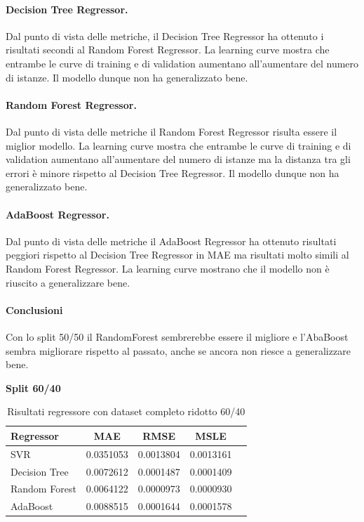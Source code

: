 \paragraph{\textbf{Decision Tree Regressor}.}
Dal punto di vista delle metriche, il Decision Tree Regressor ha ottenuto i risultati secondi al Random Forest Regressor. 
La learning curve mostra che entrambe le curve di training e di validation aumentano all'aumentare del numero di istanze. Il modello dunque non ha generalizzato bene.
\paragraph{\textbf{Random Forest Regressor}.}
Dal punto di vista delle metriche il Random Forest Regressor risulta essere il miglior modello.
La learning curve mostra che entrambe le curve di training e di validation aumentano all'aumentare del numero di istanze ma la distanza tra gli errori è minore rispetto al Decision Tree Regressor. Il modello dunque non ha generalizzato bene.
\paragraph{\textbf{AdaBoost Regressor}.}
Dal punto di vista delle metriche il AdaBoost Regressor ha ottenuto risultati peggiori rispetto al Decision Tree Regressor in MAE ma risultati molto simili al Random Forest Regressor.
La learning curve mostrano che il modello non è riuscito a generalizzare bene.

\paragraph{\textbf{Conclusioni}} Con lo split 50/50 il RandomForest sembrerebbe essere il migliore e l'AbaBoost sembra migliorare rispetto al passato, anche se ancora non riesce a generalizzare bene.

\newpage
\noindent\textbf{Split 60/40}


\begin{table}[H]
    \centering
    \begin{tabular}{|>{\centering\arraybackslash}m{5cm}|c|c|c|c|}
        \hline
        \textbf{Regressor} & \textbf{MAE} & \textbf{RMSE} & \textbf{MSLE} \\ [10pt]
        \hline
        SVR & 0.0351053 & 0.0013804 & 0.0013161 \\ [10pt]
        \hline
        Decision Tree & 0.0072612 & 0.0001487 & 0.0001409 \\ [10pt]
        \hline
        Random Forest & 0.0064122 & 0.0000973 & 0.0000930 \\ [10pt]
        \hline
        AdaBoost & 0.0088515 & 0.0001644 & 0.0001578 \\ [10pt]
        \hline
    \end{tabular}
    \caption{Risultati regressore con dataset completo ridotto 60/40}
    \label{tab:results}
\end{table}


